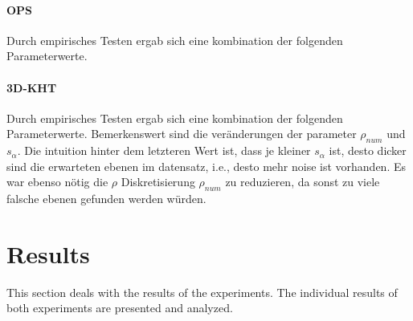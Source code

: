 \documentclass[main.tex]{subfiles}
\begin{document}
\paragraph{OPS}
Durch empirisches Testen ergab sich eine kombination der folgenden Parameterwerte.
\begin{table}[H]
    \centering
    \caption{}
    \label{tab:fin-ops}
\end{table}

\paragraph{3D-KHT}
Durch empirisches Testen ergab sich eine kombination der folgenden Parameterwerte. Bemerkenswert sind die veränderungen der parameter $\rho_{num}$ und
$s_\alpha$. Die intuition hinter dem letzteren Wert ist, dass je kleiner $s_\alpha$ ist, desto dicker sind die erwarteten ebenen im datensatz, i.e., desto
mehr noise ist vorhanden. Es war ebenso nötig die $\rho$ Diskretisierung $\rho_{num}$ zu reduzieren, da sonst zu viele falsche ebenen gefunden werden würden.

\begin{table}[H]
    \centering
    \caption{}
    \label{tab:fin-3dkht}
\end{table}

\section{Results}
This section deals with the results of the experiments. The individual results of both experiments are presented and analyzed.
\end{document}

